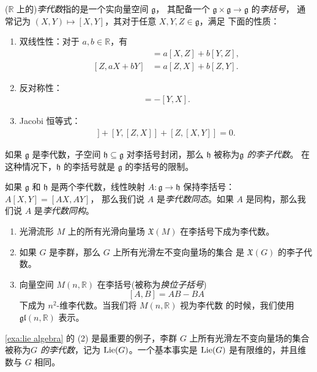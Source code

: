 ($\mathbb{R}$ 上的)\emph{李代数}指的是一个实向量空间 $\mathfrak{g}$，
其配备一个 $\mathfrak{g}\times \mathfrak{g}\to \mathfrak{g}$ 的\emph{李括号}，
通常记为 $(X,Y)\mapsto [X,Y]$，其对于任意 $X,Y,Z\in \mathfrak{g}$，满足
下面的性质：
\begin{enumerate}
  \item 双线性性：对于 $a,b\in \mathbb{R}$，有
  \begin{align*}
    [aX+bY,Z]&=a[X,Z]+b[Y,Z],\\
    [Z,aX+bY]&=a[Z,X]+b[Z,Y].
  \end{align*}
  \item 反对称性：
  \begin{align*}
    [X,Y]=-[Y,X].
  \end{align*}
  \item Jacobi 恒等式：
  \begin{align*}
    [X,[Y,Z]]+[Y,[Z,X]]+[Z,[X,Y]]=0.
  \end{align*}
\end{enumerate}
如果 $\mathfrak{g}$ 是李代数，子空间 $\mathfrak{h}\subseteq \mathfrak{g}$
对李括号封闭，那么 $\mathfrak{h}$ 被称为\emph{$\mathfrak{g}$ 的李子代数}。
在这种情况下，$\mathfrak{h}$ 的李括号就是 $\mathfrak{g}$ 的李括号的限制。

如果 $\mathfrak{g}$ 和 $\mathfrak{h}$ 是两个李代数，线性映射
$A:\mathfrak{g}\to \mathfrak{h}$ 保持李括号：$A[X,Y]=[AX,AY]$，
那么我们说 $A$ 是\emph{李代数同态}。如果 $A$ 是同构，那么我们说
$A$ 是\emph{李代数同构}。

\begin{example}[李代数]\label{exa:lie algebra}
  \mbox{}
  \begin{enumerate}
    \item 光滑流形 $M$ 上的所有光滑向量场 $\mathfrak{X}(M)$
    在李括号下成为李代数。
    \item 如果 $G$ 是李群，那么 $G$ 上所有光滑左不变向量场的集合
    是 $\mathfrak{X}(G)$ 的李子代数。
    \item 向量空间 $M(n,\mathbb{R})$ 在李括号(被称为\emph{换位子括号})
    \[
      [A,B]=AB-BA  
    \]
    下成为 $n^2$-维李代数。当我们将 $M(n,\mathbb{R})$ 视为李代数
    的时候，我们使用 $\mathfrak{gl}(n,\mathbb{R})$ 表示。
  \end{enumerate}
\end{example}

\ref{exa:lie algebra} 的 (2) 是最重要的例子，李群 $G$ 上所有光滑左不变向量场的集合
被称为\emph{$G$ 的李代数}，记为 $\operatorname{Lie}(G)$。一个基本事实是 $\operatorname{Lie}(G)$
是有限维的，并且维数与 $G$ 相同。

